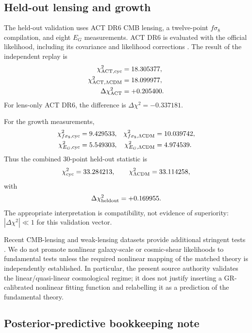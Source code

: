 \documentclass[12pt]{iopart}
\newcommand{\LCDM}{\Lambda{\rm CDM}}
\begin{document}
\subsection{Held-out lensing and growth}

The held-out validation uses ACT DR6 CMB lensing, a twelve-point $f\sigma_8$ compilation, and eight $E_G$ measurements.  ACT DR6 is evaluated with the official likelihood, including its covariance and likelihood corrections \cite{MadhavacherilACT2023}.  The result of the independent replay is
\begin{align}
\chi^2_{\rm ACT,cyc}&=18.305377,\\
\chi^2_{\rm ACT,\LCDM}&=18.099977,\\
\Delta\chi^2_{\rm ACT}&=+0.205400.
\end{align}
For lens-only ACT DR6, the difference is $\Delta\chi^2=-0.337181$.

For the growth measurements,
\begin{align}
\chi^2_{f\sigma_8,{\rm cyc}}&=9.429533, &
\chi^2_{f\sigma_8,\LCDM}&=10.039742,\\
\chi^2_{E_G,{\rm cyc}}&=5.549303, &
\chi^2_{E_G,\LCDM}&=4.974539.
\end{align}
Thus the combined 30-point held-out statistic is
\begin{equation}
\chi^2_{\rm cyc}=33.284213,\qquad
\chi^2_{\LCDM}=33.114258,
\end{equation}
with
\begin{equation}
\Delta\chi^2_{\rm heldout}=+0.169955.
\label{eq:heldout}
\end{equation}
The appropriate interpretation is compatibility, not evidence of superiority: $|\Delta\chi^2|\ll1$ for this validation vector.

Recent CMB-lensing and weak-lensing datasets provide additional stringent tests \cite{PanSPT2023,AmonDES2022,SeccoDES2022,DalalHSC2023,LiHSC2023}.  We do not promote nonlinear galaxy-scale or cosmic-shear likelihoods to fundamental tests unless the required nonlinear mapping of the matched theory is independently established.  In particular, the present source authority validates the linear/quasi-linear cosmological regime; it does not justify inserting a GR-calibrated nonlinear fitting function and relabelling it as a prediction of the fundamental theory.

\subsection{Posterior-predictive bookkeeping note}
\end{document}
